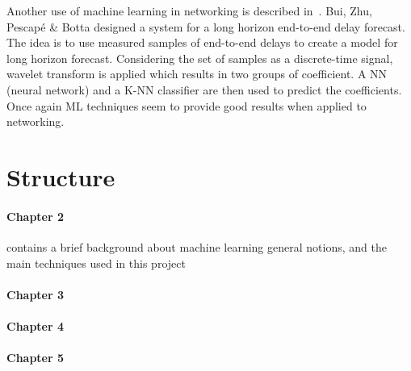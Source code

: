 Another use of machine learning in networking is described in~\cite{end-to-end}. Bui, Zhu, Pescapé \& Botta designed a system for a long horizon end-to-end delay forecast. The idea is to use measured samples of end-to-end delays to create a model for long horizon forecast. Considering the set of samples as a discrete-time signal, wavelet transform is applied which results in two groups of coefficient. A NN (neural network) and a K-NN classifier are then used to predict the coefficients. Once again ML techniques seem to provide good results when applied to networking.

\section{Structure}
\paragraph{Chapter 2} contains a brief background about machine learning general notions, and the main techniques used in this project 
\paragraph{Chapter 3}
\paragraph{Chapter 4}
\paragraph{Chapter 5}

